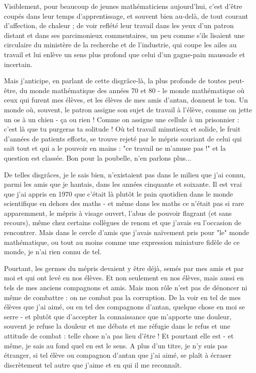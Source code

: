 Visiblement, pour beaucoup de jeunes mathématiciens aujourd'hui, c'est d'être coupés dans leur temps d'apprentissage, et souvent bien au-delà, de tout courant d'affection, de chaleur ; de voir reflété leur travail dans les yeux d'un patron distant et dans ses parcimonieux commentaires, un peu comme s'ils lisaient une circulaire du ministère de la recherche et de l'industrie, qui coupe les ailes au travail et lui enlève un sens plus profond que celui d'un gagne-pain maussade et incertain.

Mais j'anticipe, en parlant de cette disgrâce-là, la plus profonde de toutes peut-être, du monde mathématique des années 70 et 80 - le monde mathématique où ceux qui furent mes élèves, et les élèves de mes amis d'antan, donnent le ton. Un monde où, souvent, le patron assigne son sujet de travail à l'élève, comme on jette un os à un chien - ça ou rien ! Comme on assigne une cellule à un prisonnier : c'est là que tu purgeras ta solitude ! Où tel travail minutieux et solide, le fruit d'années de patients efforts, se trouve rejeté par le mépris souriant de celui qui sait tout et qui a le pouvoir en mains : "ce travail ne m'amuse pas !" et la question est classée. Bon pour la poubelle, n'en parlons plus...

De telles disgrâces, je le sais bien, n'existaient pas dans le milieu que j'ai connu, parmi les amis que je hantais, dans les années cinquante et soixante. Il est vrai que j'ai appris en 1970 que c'était là plutôt le pain quotidien dans le monde scientifique en dehors des maths - et même dans les maths ce n'était pas si rare apparemment, le mépris à visage ouvert, l'abus de pouvoir flagrant (et sans recours), même chez certains collègues de renom et que j'avais eu l'occasion de rencontrer. Mais dans le cercle d'amis que j'avais naïvement pris pour "le" monde mathématique, ou tout au moins comme une expression miniature fidèle de ce monde, je n'ai rien connu de tel.

Pourtant, les germes du mépris devaient y être déjà, semés par mes amis et par moi et qui ont levé en nos élèves. Et non seulement en nos élèves, mais aussi en tels de mes anciens compagnons et amis. Mais mon rôle n'est pas de dénoncer ni même de combattre : on ne combat pas la corruption. De la voir en tel de mes élèves que j'ai aimé, ou en tel des compagnons d'antan, quelque chose en moi se serre - et plutôt que d'accepter la connaissance que m'apporte une douleur, souvent je refuse la douleur et me débats et me réfugie dans le refus et une attitude de combat : telle chose n'a pas lieu d'être ! Et pourtant elle est - et même, je sais au fond quel en est le sens. A plus d'un titre, je n'y suis pas étranger, si tel élève ou compagnon d'antan que j'ai aimé, se plaît à écraser discrètement tel autre que j'aime et en qui il me reconnaît.

